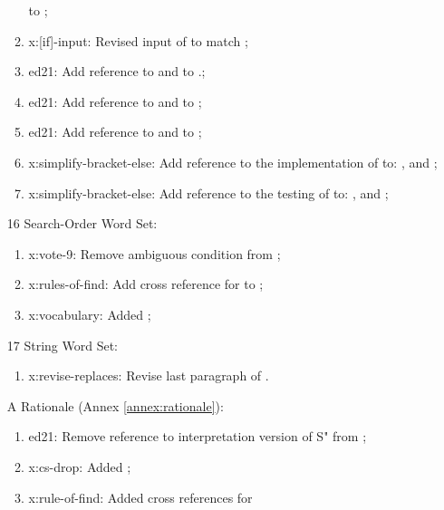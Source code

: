 \begin{itemize}
\begin{enumerate}
			to ;
		\item \textsf{x:[if]-input}: Revised input of  to match
			;
		\item \textsf{ed21}: Add reference to \word[tools]{[IF]} and \word[tools]{[THEN]}
			to .;
		\item \textsf{ed21}: Add reference to \word[tools]{[ELSE]} and \word[tools]{[THEN]}
			to ;
		\item \textsf{ed21}: Add reference to \word[tools]{[IF]} and \word[tools]{[ELSE]}
			to ;
		\item \textsf{x:simplify-bracket-else}: Add reference to the implementation of
			\word[tools]{[ELSE]} to:
			,
			 and
			;
		\item \textsf{x:simplify-bracket-else}: Add reference to the testing of
			\word[tools]{[THEN]} to:
			,
			 and
			;
		\end{enumerate}
	\item[16] Search-Order Word Set:		%
		\begin{enumerate}
		\item \textsf{x:vote-9}: Remove ambiguous condition from
			;
		\item \textsf{x:rules-of-find}: Add cross reference for
			 to ;
		\item \textsf{x:vocabulary}: Added ;
		\end{enumerate}
	\item[17] String Word Set:				%
		\begin{enumerate}
		\item \textsf{x:revise-replaces}: Revise last paragraph of .
		\end{enumerate}
	\item[A] Rationale (Annex \ref{annex:rationale}):	%
		\begin{enumerate}
		\item \textsf{ed21}: Remove reference to interpretation version of S" from ;
		\item \textsf{x:cs-drop}: Added ;
		\item \textsf{x:rule-of-find}: Added cross references for

\end{enumerate}
\end{itemize}
